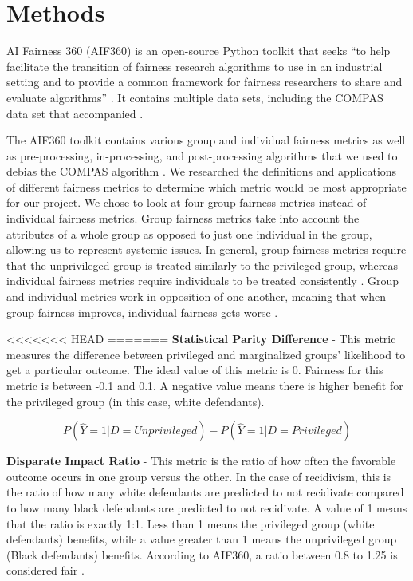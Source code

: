 \documentclass[water,article,submit,moreauthors,pdftex]{mdpi}
\begin{document}
\hypertarget{methods}{%
\section{Methods}\label{methods}}

AI Fairness 360 (AIF360) is an open-source Python toolkit that seeks
``to help facilitate the transition of fairness research algorithms to
use in an industrial setting and to provide a common framework for
fairness researchers to share and evaluate algorithms''
\citep{aif360-oct-2018}. It contains multiple data sets, including the
COMPAS data set that accompanied \citet{angwin2016machine}.

The AIF360 toolkit contains various group and individual fairness
metrics as well as pre-processing, in-processing, and post-processing
algorithms that we used to debias the COMPAS algorithm
\citep{aif360-oct-2018}. We researched the definitions and applications
of different fairness metrics \citep{ashokan2021fairness} to determine
which metric would be most appropriate for our project. We chose to look
at four group fairness metrics instead of individual fairness metrics.
Group fairness metrics take into account the attributes of a whole group
as opposed to just one individual in the group, allowing us to represent
systemic issues. In general, group fairness metrics require that the
unprivileged group is treated similarly to the privileged group, whereas
individual fairness metrics require individuals to be treated
consistently \citep{kypraiou_what_2021}. Group and individual metrics
work in opposition of one another, meaning that when group fairness
improves, individual fairness gets worse \citep{kypraiou_what_2021}.

<<<<<<< HEAD
=======
\textbf{Statistical Parity Difference} - This metric measures the
difference between privileged and marginalized groups' likelihood to get
a particular outcome. The ideal value of this metric is 0. Fairness for
this metric is between -0.1 and 0.1. A negative value means there is
higher benefit for the privileged group (in this case, white
defendants).

\[P(\hat{Y}=1|D=Unprivileged) - P(\hat{Y}=1|D=Privileged)\]

\textbf{Disparate Impact Ratio} - This metric is the ratio of how often
the favorable outcome occurs in one group versus the other. In the case
of recidivism, this is the ratio of how many white defendants are
predicted to not recidivate compared to how many black defendants are
predicted to not recidivate. A value of 1 means that the ratio is
exactly 1:1. Less than 1 means the privileged group (white defendants)
benefits, while a value greater than 1 means the unprivileged group
(Black defendants) benefits. According to AIF360, a ratio between 0.8 to
1.25 is considered fair \citep{Ronaghan2019AI}.
\end{document}

